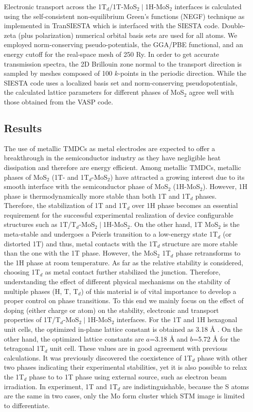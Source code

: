 Electronic transport across the 1T$_d$/1T-MoS$_2\mid$1H-MoS$_2$ interfaces is calculated using the self-consistent non-equilibrium Green's functions (NEGF) technique as implemented in TranSIESTA\cite{transiesta} which is interfaced with the SIESTA code.\cite{siesta} Double-zeta (plus polarization) numerical orbital basis sets are used for all atoms. We employed norm-conserving pseudo-potentials\cite{tm}, the GGA/PBE functional, and an energy cutoff for the real-space mesh of 250 Ry.  In order to get accurate transmission spectra, the 2D Brillouin zone normal to the transport direction is sampled by meshes composed of  100 $k$-points in the periodic direction. While the SIESTA code uses a localized basis set and norm-conserving pseudopotentials, the calculated lattice parameters for different phases of MoS$_2$ agree well with those obtained from the VASP  code. 


\subsection{Results}
The use of metallic TMDCs as metal electrodes are expected to offer a breakthrough in the semiconductor industry as they have negligible heat dissipation and therefore are energy efficient. Among metallic TMDCs, metallic phases of MoS$_2$ (1T- and 1T$_d$-MoS$_2$) have attracted a growing interest due to its smooth interface with  the semiconductor phase of MoS$_2$ (1H-MoS$_2$). 
However, 1H phase is thermodynamically more stable than both 1T and 1T$_d$ phases. Therefore, the stabilization of 1T and 1T$_d$  over 1H phase becomes an essential requirement for the successful experimental realization of device configurable structures such as 1T/T$_d$-MoS$_{2}\mid$1H-MoS$_2$. On the other hand, 1T MoS$_2$ is the meta-stable and undergoes a Peierls transition to a low-energy state 1T$_d$ (or distorted 1T) and thus, metal contacts with the 1T$_d$ structure are more stable than the one with the 1T phase. However, the MoS$_2$ 1T$_d$ phase retransforms to the 1H phase at room temperature. 
As far as the relative stability is considered, choosing 1T$_d$ as metal contact further stabilized the junction.
Therefore, understanding the effect of different physical mechanisms on the stability of multiple phases (H, T, T$_d$) of this material is of vital importance to develop a proper control on phase transitions. To this end we mainly focus on the effect of doping (either charge or atom) on the stability, electronic and transport properties of 1T/T$_d$-MoS$_2\mid$1H-MoS$_2$ interfaces.  For the 1T and 1H hexagonal unit cells, the optimized in-plane lattice constant is obtained as 3.18 {\AA} .  On the other hand, the optimized lattice constants are $a$=3.18 {\AA}  and  $b$=5.72 {\AA} for  the tetragonal 1T$_d$ unit cell. 
These values are in good agreement with previous calculations\cite{C5NR07715J}. It was previously discovered the coexistence of 1T$_d$ phase with other two phases indicating their experimental stabilities, yet it is also possible to  relax the 1T$_d$ phase to to 1T phase using external source, such as electron beam irradiation\cite{Eda2012}. 
In experiment, 1T and 1T$_d$ are indistinguishable, because the S atoms are the same in two cases, only the Mo form cluster which STM image is limited to differentiate.


